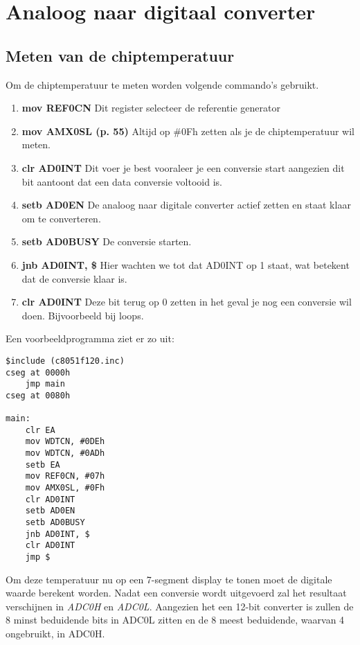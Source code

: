 \documentclass{report}
\begin{document}
\chapter{Analoog naar digitaal converter}
\section{Meten van de chiptemperatuur}
Om de chiptemperatuur te meten worden volgende commando's gebruikt.
\begin{enumerate}
	\item \textbf{mov REF0CN}
	\newline
	Dit register selecteer de referentie generator
	\item \textbf{mov AMX0SL (p. 55)}
	\newline
	Altijd op \#0Fh zetten als je de chiptemperatuur wil meten.
	\item \textbf{clr AD0INT}
	\newline
	Dit voer je best vooraleer je een conversie start aangezien dit bit aantoont dat een data conversie voltooid is.
	\item \textbf{setb AD0EN}
	\newline
	De analoog naar digitale converter actief zetten en staat klaar om te converteren.
	\item \textbf{setb AD0BUSY}
	\newline
	De conversie starten.
	\item \textbf{jnb AD0INT, \$}
	\newline
	Hier wachten we tot dat AD0INT op 1 staat, wat betekent dat de conversie klaar is.
	\item \textbf{clr AD0INT}
	\newline
	Deze bit terug op 0 zetten in het geval je nog een conversie wil doen. Bijvoorbeeld bij loops.
\end{enumerate}
Een voorbeeldprogramma ziet er zo uit:
\begin{lstlisting}
$include (c8051f120.inc)
cseg at 0000h
	jmp main
cseg at 0080h

main:
	clr EA
	mov WDTCN, #0DEh
	mov WDTCN, #0ADh
	setb EA
	mov REF0CN, #07h
	mov AMX0SL, #0Fh
	clr AD0INT	
	setb AD0EN
	setb AD0BUSY
	jnb AD0INT, $	
	clr AD0INT	
	jmp $
\end{lstlisting}

Om deze temperatuur nu op een 7-segment display te tonen moet de digitale waarde berekent worden. Nadat een conversie wordt uitgevoerd zal het resultaat verschijnen in \textit{ADC0H} en \textit{ADC0L}. Aangezien het een 12-bit converter is zullen de 8 minst beduidende bits in ADC0L zitten en de 8 meest beduidende, waarvan 4 ongebruikt, in ADC0H.
\end{document}
